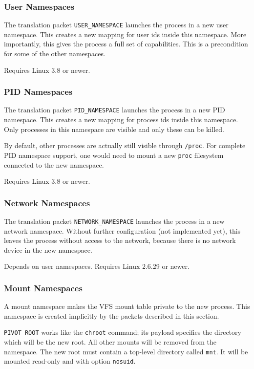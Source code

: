 \documentclass[a4paper,12pt]{article}
\begin{document}
\subsubsection{User Namespaces}

The translation packet \verb|USER_NAMESPACE| launches the process in a
new user namespace.  This creates a new mapping for user ids inside
this namespace.  More importantly, this gives the process a full set
of capabilities.  This is a precondition for some of the other
namespaces.

Requires Linux 3.8 or newer.

\subsubsection{PID Namespaces}

The translation packet \verb|PID_NAMESPACE| launches the process in a
new PID namespace.  This creates a new mapping for process ids inside
this namespace.  Only processes in this namespace are visible and only
these can be killed.

By default, other processes are actually still visible through
\texttt{/proc}.  For complete PID namespace support, one would need to
mount a new \texttt{proc} filesystem connected to the new namespace.

Requires Linux 3.8 or newer.

\subsubsection{Network Namespaces}

The translation packet \verb|NETWORK_NAMESPACE| launches the process
in a new network namespace.  Without further configuration (not
implemented yet), this leaves the process without access to the
network, because there is no network device in the new namespace.

Depends on user namespaces.  Requires Linux 2.6.29 or newer.

\subsubsection{Mount Namespaces}

A mount namespace makes the VFS mount table private to the new
process.  This namespace is created implicitly by the packets
described in this section.

\verb|PIVOT_ROOT| works like the \texttt{chroot} command; its
payload specifies the directory which will be the new root.  All other
mounts will be removed from the namespace.  The new root must contain
a top-level directory called \texttt{mnt}.  It will be mounted
read-only and with option \texttt{nosuid}.
\end{document}
